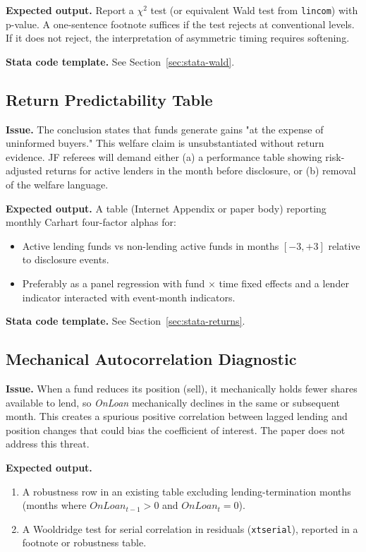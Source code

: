 \documentclass[11pt, a4paper]{article}
\begin{document}
\textbf{Expected output.} Report a $\chi^2$ test (or equivalent Wald test from \texttt{lincom})
with p-value. A one-sentence footnote suffices if the test rejects at conventional levels.
If it does not reject, the interpretation of asymmetric timing requires softening.

\textbf{Stata code template.} See Section~\ref{sec:stata-wald}.

\subsection{Return Predictability Table}

\textbf{Issue.} The conclusion states that funds generate gains "at the expense of uninformed
buyers." This welfare claim is unsubstantiated without return evidence. JF referees will demand
either (a) a performance table showing risk-adjusted returns for active lenders in the month
before disclosure, or (b) removal of the welfare language.

\textbf{Expected output.} A table (Internet Appendix or paper body) reporting monthly
Carhart four-factor alphas for:
\begin{itemize}[leftmargin=2em]
  \item Active lending funds vs non-lending active funds in months $[-3, +3]$ relative to
        disclosure events.
  \item Preferably as a panel regression with fund $\times$ time fixed effects and a lender
        indicator interacted with event-month indicators.
\end{itemize}

\textbf{Stata code template.} See Section~\ref{sec:stata-returns}.

\subsection{Mechanical Autocorrelation Diagnostic}

\textbf{Issue.} When a fund reduces its position (sell), it mechanically holds fewer shares
available to lend, so \textit{OnLoan} mechanically declines in the same or subsequent month.
This creates a spurious positive correlation between lagged lending and position changes that
could bias the coefficient of interest. The paper does not address this threat.

\textbf{Expected output.}
\begin{enumerate}[leftmargin=2em]
  \item A robustness row in an existing table excluding lending-termination months (months where
        $\mathit{OnLoan}_{t-1} > 0$ and $\mathit{OnLoan}_t = 0$).
  \item A Wooldridge test for serial correlation in residuals (\texttt{xtserial}), reported in a
        footnote or robustness table.
\end{enumerate}
\end{document}
